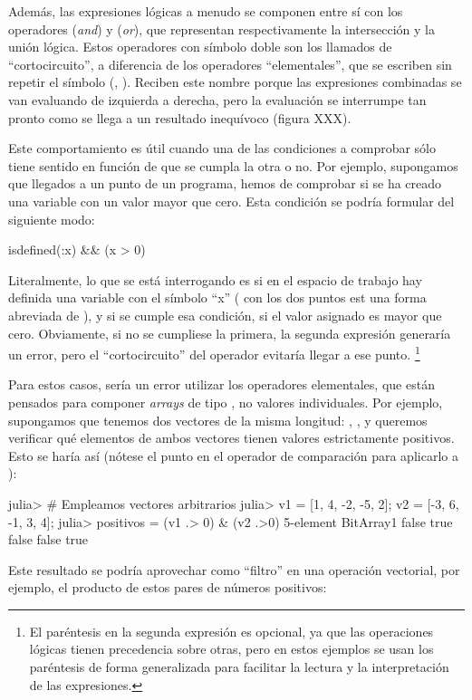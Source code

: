 ﻿\documentclass[spanish]{article}
\begin{document}
Además, las expresiones lógicas a menudo se componen entre sí con los operadores
\code{&&} (\emph{and}) y \code{||} (\emph{or}), que representan respectivamente
la intersección y la unión lógica. Estos operadores con símbolo doble
son los llamados de ``cortocircuito'', a diferencia de los operadores
``elementales'', que se escriben sin repetir el símbolo (\code{&}, \code{|}).
Reciben este nombre porque las expresiones combinadas se van evaluando de
izquierda a derecha, pero la evaluación se interrumpe tan pronto como se llega
a un resultado inequívoco (figura XXX).

Este comportamiento es útil cuando una de las condiciones a comprobar sólo
tiene sentido en función de que se cumpla la otra o no.
Por ejemplo, supongamos que llegados a un punto de un programa, hemos de
comprobar si se ha creado una variable  con un valor mayor que cero.
Esta condición se podría formular del siguiente modo:

isdefined(:x) && (x > 0)

Literalmente, lo que se está interrogando es si en el espacio de trabajo
hay definida una variable con el símbolo ``x'' ( con los dos puntos
est una forma abreviada de ), y si se cumple esa condición,
si el valor asignado es mayor que cero. Obviamente, si no se cumpliese la
primera, la segunda expresión generaría un error, pero el ``cortocircuito''
del operador \code{&&} evitaría llegar a ese punto.%
\footnote{El paréntesis en la segunda expresión es opcional, ya que las
operaciones lógicas tienen precedencia sobre otras, pero en estos ejemplos
se usan los paréntesis de forma generalizada para facilitar la lectura y
la interpretación de las expresiones.}

Para estos casos, sería un error utilizar los operadores elementales, que
están pensados para componer \emph{arrays} de tipo , no valores
individuales. Por ejemplo, supongamos que tenemos dos vectores de la misma
longitud: , , y queremos verificar qué elementos de ambos
vectores tienen valores estrictamente positivos. Esto se haría así
(nótese el punto en el operador de comparación para aplicarlo a ):

julia> # Empleamos vectores arbitrarios 
julia> v1 = [1, 4, -2, -5, 2]; v2 = [-3, 6, -1, 3, 4];
julia> positivos = (v1 .> 0) & (v2 .>0)
5-element BitArray{1}
 false
  true
 false
 false
  true

Este resultado se podría aprovechar como ``filtro'' en una operación vectorial,
por ejemplo, el producto de estos pares de números positivos:
\end{document}
